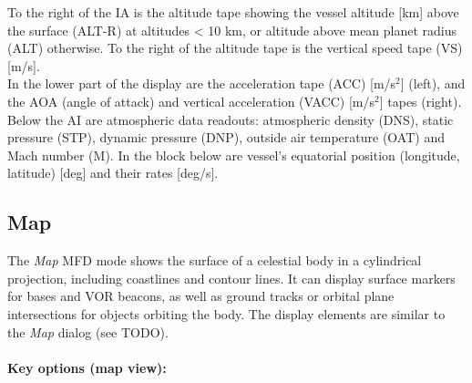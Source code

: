 \documentclass[Orbiter User Manual.tex]{subfiles}
\begin{document}
\noindent
To the right of the IA is the altitude tape showing the vessel altitude [km] above the surface (ALT-R) at altitudes < 10 km, or altitude above mean planet radius (ALT) otherwise. To the right of the altitude tape is the vertical speed tape (VS) [m/s].\\
In the lower part of the display are the acceleration tape (ACC) [m/s$^{2}$] (left), and the AOA (angle of attack) and vertical acceleration (VACC) [m/s$^{2}$] tapes (right).\\
Below the AI are atmospheric data readouts: atmospheric density (DNS), static pressure (STP), dynamic pressure (DNP), outside air temperature (OAT) and Mach number (M). In the block below are vessel's equatorial position (longitude, latitude) [deg] and their rates [deg/s].


\subsection{Map}
The \textit{Map} MFD mode shows the surface of a celestial body in a cylindrical projection, including coastlines and contour lines. It can display surface markers for bases and VOR beacons, as well as ground tracks or orbital plane intersections for objects orbiting the body. The display elements are similar to the \textit{Map} dialog (see TODO).\\
\\
\textbf{Key options (map view):}
\end{document}
